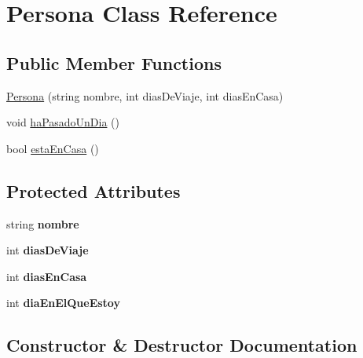 \hypertarget{classPersona}{}\section{Persona Class Reference}
\label{classPersona}
\subsection*{Public Member Functions}
\begin{DoxyCompactItemize}
\item 
\hyperlink{classPersona_af7190c48b90a17ca738984b2ee089ccd}{Persona} (string nombre, int dias\+De\+Viaje, int dias\+En\+Casa)
\item 
void \hyperlink{classPersona_a5597f15fac8bf8ee841b67ae322aba89}{ha\+Pasado\+Un\+Dia} ()
\item 
bool \hyperlink{classPersona_ac8f5dc07c92be566a811cdb148e4768b}{esta\+En\+Casa} ()
\end{DoxyCompactItemize}
\subsection*{Protected Attributes}
\begin{DoxyCompactItemize}
\item 
\mbox{\label{classPersona_a08be6fe295c330f6fb2d479d466f2946}} 
string {\bfseries nombre}
\item 
\mbox{\label{classPersona_a4c3d830163ca418d168f2c4555c3b66d}} 
int {\bfseries dias\+De\+Viaje}
\item 
\mbox{\label{classPersona_aa19b8bbb62068ad0d2bcfcefd81cb28f}} 
int {\bfseries dias\+En\+Casa}
\item 
\mbox{\label{classPersona_a57d753bce122972cedbd768b65a407af}} 
int {\bfseries dia\+En\+El\+Que\+Estoy}
\end{DoxyCompactItemize}


\subsection{Constructor \& Destructor Documentation}
\mbox{\label{classPersona_af7190c48b90a17ca738984b2ee089ccd}} 
